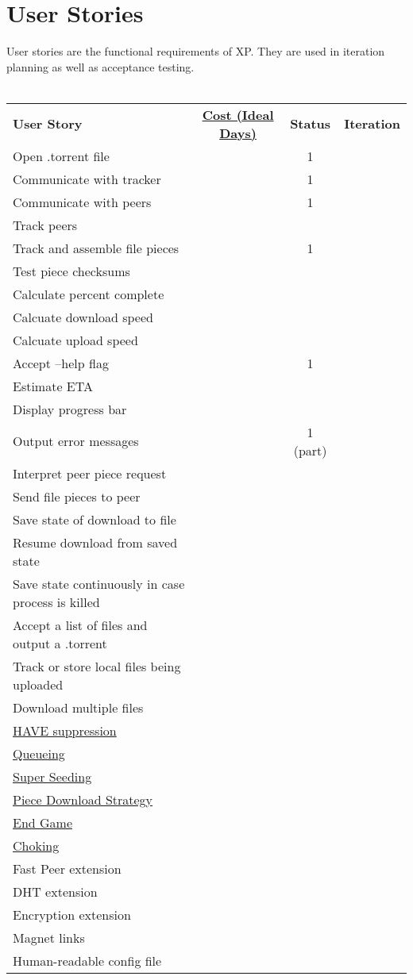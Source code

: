 \documentclass[letter]{scrartcl}
\begin{document}
\section{User Stories}
User stories are the functional requirements of XP. They are used in iteration planning as well as acceptance testing.
\\\\
\begin{tabularx}{\textwidth}{X c c c}
\textbf{User Story} & \href{http://c2.com/cgi/wiki?IdealProgrammingTime}{\textbf{Cost (Ideal Days)}}
& \textbf{Status} & \textbf{Iteration} \\
Open .torrent file & & 1 \\
Communicate with tracker & & 1 \\
Communicate with peers & & 1 \\
Track peers \\
Track and assemble file pieces & & 1 \\
Test piece checksums \\
Calculate percent complete \\
Calcuate download speed \\
Calcuate upload speed \\
Accept --help flag & & 1 \\
Estimate ETA \\
Display progress bar \\
Output error messages & & 1 (part) \\
Interpret peer piece request \\
Send file pieces to peer \\
Save state of download to file \\
Resume download from saved state \\
Save state continuously in case process is killed \\
Accept a list of files and output a .torrent \\
Track or store local files being uploaded \\
Download multiple files \\
\href{https://wiki.theory.org/BitTorrentSpecification\#have:_.3Clen.3D0005.3E.3Cid.3D4.3E.3Cpiece_index.3E}{HAVE suppression} \\
\href{https://wiki.theory.org/BitTorrentSpecification\#Queuing}{Queueing} \\
\href{https://wiki.theory.org/BitTorrentSpecification\#Super_Seeding}{Super Seeding} \\
\href{https://wiki.theory.org/BitTorrentSpecification\#Piece_downloading_strategy}{Piece Download Strategy} \\
\href{https://wiki.theory.org/BitTorrentSpecification\#End_Game}{End Game} \\
\href{https://wiki.theory.org/BitTorrentSpecification\#Choking_and_Optimistic_Unchoking}{Choking} \\
Fast Peer extension \\
DHT extension \\
Encryption extension \\
Magnet links \\
Human-readable config file
\end{tabularx}
\end{document}
